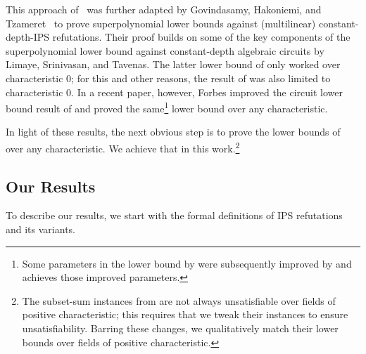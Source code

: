 \documentclass[11pt]{article}
\newcommand{\comment}[2]{\marginpar{\tiny{\textbf{#1: }\textit{#2}}}}
\newcommand{\snote}[1]{\comment{SS}{#1}}
\begin{document}
This approach of~\cite{FSTW21} was further adapted by Govindasamy, Hakoniemi, and Tzameret~\cite{GHT} to prove superpolynomial lower bounds against (multilinear) constant-depth-IPS refutations. Their proof builds on some of the key components of the superpolynomial lower bound against constant-depth algebraic circuits by Limaye, Srinivasan, and Tavenas. The latter lower bound of \cite{LST} only worked over characteristic $0$; for this and other reasons, the result of \cite{GHT} was also limited to characteristic $0$. In a recent paper, however, Forbes \cite{Forbes-LST-CCC} improved the circuit lower bound result of \cite{LST} and proved the same\footnote{Some parameters in the lower bound by \cite{LST} were subsequently improved by \cite{BDS24} and \cite{Forbes-LST-CCC} achieves those improved parameters.} lower bound over any characteristic. 

In light of these results, the next obvious step is to prove the lower bounds of~\cite{FSTW21,GHT} over any characteristic. We achieve that in this work.\footnote{The subset-sum instances from \cite{FSTW21,GHT} are not always unsatisfiable over fields of positive characteristic; this requires that we tweak their instances to ensure unsatisfiability. Barring these changes, we qualitatively match their lower bounds over fields of positive characteristic.}




    
    
    
    








\subsection{Our Results}
\label{sec:results}
To describe our results, we start with the formal definitions of IPS refutations and its variants. 
\end{document}
